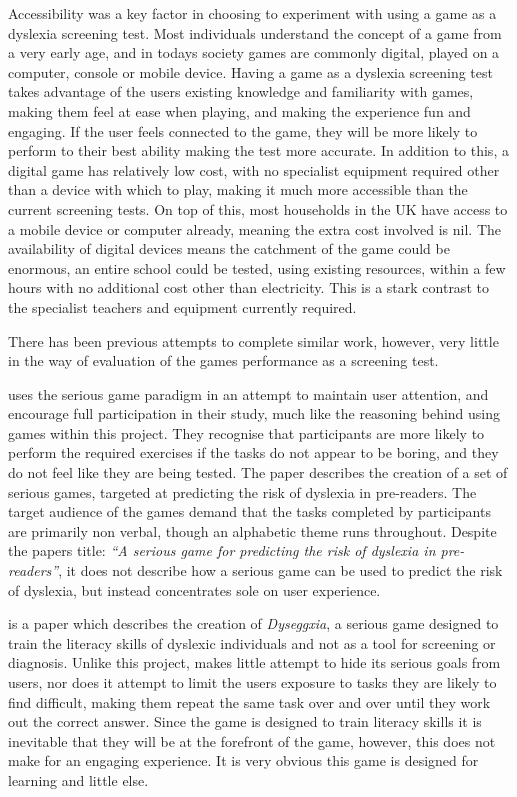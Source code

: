 \documentclass[journal]{IEEEtran}
\begin{document}
Accessibility was a key factor in choosing to experiment with using a game as a dyslexia screening test. Most individuals understand the concept of a game from a very early age, and in todays society games are commonly digital, played on a computer, console or mobile device. %
Having a game as a dyslexia screening test takes advantage of the users existing knowledge and familiarity with games, making them feel at ease when playing, and making the experience fun and engaging. If the user feels connected to the game, they will be more likely to perform to their best ability making the test more accurate. In addition to this, a digital game has relatively low cost, with no specialist equipment 
required other than a device with which to play, making it much more accessible than the current screening tests. On top of this, most households in the UK have access to a mobile device or computer already, meaning the extra cost involved is nil\cite{2013GamesData}. 
The availability of digital devices means the catchment of the game could be enormous, an entire school could be tested, using existing resources, within a few hours with no additional cost other than electricity. This is a stark contrast to the specialist teachers and equipment currently required.

There has been previous attempts to complete similar work, however, very little in the way of evaluation of the games performance as a screening test.

\cite{SeriousForPredicting} uses the serious game paradigm in an attempt to maintain user attention, and encourage full participation in their study, much like the reasoning behind using games within this project. They recognise that participants are more likely to perform the required exercises if the tasks do not appear to be boring, and they do not feel like they are being tested. The paper describes the creation of a set of serious games, targeted at predicting the risk of dyslexia in pre-readers. The target audience of the games demand that the tasks completed by participants are primarily non verbal, though an alphabetic theme runs throughout.  Despite the papers title: \emph{``A serious game for predicting the risk of dyslexia in pre-readers''}, it does not describe how a serious game can be used to predict the risk of dyslexia, but instead concentrates sole on user experience.

\cite{Dyseggxia} is a paper which describes the creation of \textit{Dyseggxia}, a serious game designed to train the literacy skills of dyslexic individuals and not as a tool for screening or diagnosis.  Unlike this project, \cite{Dyseggxia} makes little attempt to hide its serious goals from users, nor does it attempt to limit the users exposure to tasks they are likely to find difficult, making them repeat the same task over and over until they work out the correct answer. Since the game is designed to train literacy skills it is inevitable that they will be at the forefront of the game, however, this does not make for an engaging experience. It is very obvious this game is designed for learning and little else. 
\end{document}
